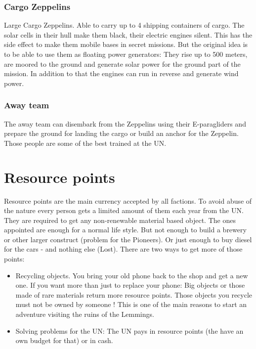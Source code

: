 \subsubsection{Cargo Zeppelins}
\label{sec: UN Cargo Zeppelins}
Large Cargo Zeppelins. Able to carry up to 4 shipping containers of cargo. The solar cells in their hull make them black, their electric engines silent. This has the side effect to make them mobile bases in secret missions. But the original idea is to be able to use them as floating power generators: They rise up to 500 meters, are moored to the ground and generate solar power for the ground part of the mission. In addition to that the engines can run in reverse and generate wind power.

\subsubsection{Away team}
\label{sec: UN away team}
The away team can disembark from the Zeppelins using their E-paragliders and prepare the ground for landing the cargo or build an anchor for the Zeppelin. Those people are some of the best trained at the UN.


\section{Resource points}
\label{sec:Resource Points}
Resource points are the main currency accepted by all factions. To avoid abuse of the nature every person gets a limited amount of them each year from the UN. They are required to get any non-renewable material based object. The ones appointed are enough for a normal life style. But not enough to build a brewery or other larger construct (problem for the Pioneers). Or just enough to buy diesel for the cars - and nothing else  (Lost). There are two ways to get more of those points:

\begin{itemize}
    \item Recycling objects. You bring your old phone back to the shop and get a new one. If you want more than just to replace your phone: Big objects or those made of rare materials return more resource points. Those objects you recycle must not be owned by someone ! This is one of the main reasons to start an adventure visiting the ruins of the Lemmings.
    \item Solving problems for the UN: The UN pays in resource points (the have an own budget for that) or in cash.
\end{itemize}

